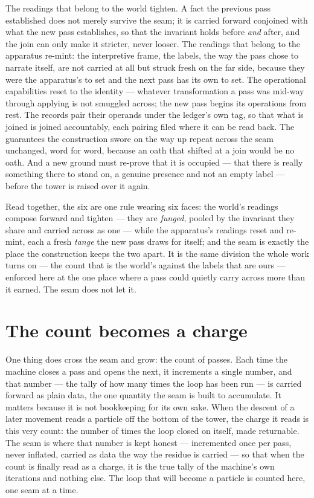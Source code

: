 The readings that belong to the world tighten. A fact the previous pass established does not merely survive
the seam; it is carried forward conjoined with what the new pass establishes, so that the invariant holds
before \emph{and} after, and the join can only make it stricter, never looser. The readings that belong to
the apparatus re-mint: the interpretive frame, the labels, the way the pass chose to narrate itself, are not
carried at all but struck fresh on the far side, because they were the apparatus's to set and the next pass
has its own to set. The operational capabilities reset to the identity --- whatever transformation a pass
was mid-way through applying is not smuggled across; the new pass begins its operations from rest. The
records pair their operands under the ledger's own tag, so that what is joined is joined accountably, each
pairing filed where it can be read back. The guarantees the construction swore on the way up repeat across
the seam unchanged, word for word, because an oath that shifted at a join would be no oath. And a new
ground must re-prove that it is occupied --- that there is really something there to stand on, a genuine
presence and not an empty label --- before the tower is raised over it again.

Read together, the six are one rule wearing six faces: the world's readings compose forward and tighten ---
they are \emph{funged}, pooled by the invariant they share and carried across as one --- while the
apparatus's readings reset and re-mint, each a fresh \emph{tange} the new pass draws for itself; and the
seam is exactly the place the construction keeps the two apart. It is the same division the whole work turns on --- the count that is the world's against the labels
that are ours --- enforced here at the one place where a pass could quietly carry across more than it
earned. The seam does not let it.

\section{The count becomes a charge}
\label{se:count-becomes-a-charge}

One thing does cross the seam and grow: the count of passes. Each time the machine closes a pass and opens
the next, it increments a single number, and that number --- the tally of how many times the loop has been
run --- is carried forward as plain data, the one quantity the seam is built to accumulate. It matters
because it is not bookkeeping for its own sake. When the descent of a later movement reads a particle off
the bottom of the tower, the charge it reads is this very count: the number of times the loop closed on
itself, made returnable. The seam is where that number is kept honest --- incremented once per pass, never
inflated, carried as data the way the residue is carried --- so that when the count is finally read as a
charge, it is the true tally of the machine's own iterations and nothing else. The loop that will become a
particle is counted here, one seam at a time.

